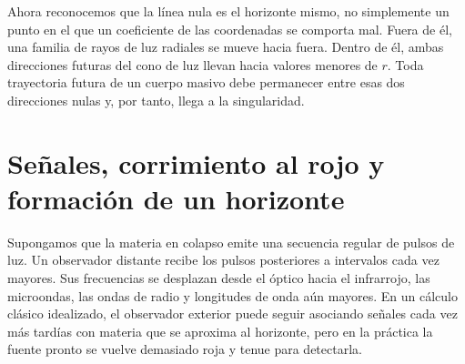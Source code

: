 Ahora reconocemos que la línea nula es el horizonte mismo, no simplemente un punto en el que un coeficiente de las coordenadas se comporta mal. Fuera de él, una familia de rayos de luz radiales se mueve hacia fuera. Dentro de él, ambas direcciones futuras del cono de luz llevan hacia valores menores de \(r\). Toda trayectoria futura de un cuerpo masivo debe permanecer entre esas dos direcciones nulas y, por tanto, llega a la singularidad.

\section{Señales, corrimiento al rojo y formación de un horizonte}

Supongamos que la materia en colapso emite una secuencia regular de pulsos de luz. Un observador distante recibe los pulsos posteriores a intervalos cada vez mayores. Sus frecuencias se desplazan desde el óptico hacia el infrarrojo, las microondas, las ondas de radio y longitudes de onda aún mayores. En un cálculo clásico idealizado, el observador exterior puede seguir asociando señales cada vez más tardías con materia que se aproxima al horizonte, pero en la práctica la fuente pronto se vuelve demasiado roja y tenue para detectarla.

\begin{classroomqa}
\end{classroomqa}

\begin{classroomqa}
\end{classroomqa}

